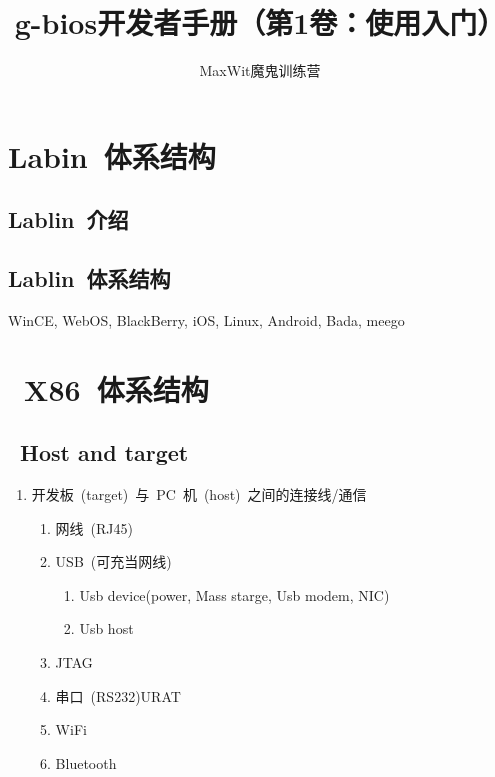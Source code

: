 \documentclass[a4paper,11pt]{article}
\title{g-bios开发者手册（第1卷：使用入门）}
\author{MaxWit魔鬼训练营}
\begin{document}
\begin{CJK*}{UTF8}{gbsn}
\CJKtilde
\maketitle
\tableofcontents

\fi

\clearpage
\section{Labin~体系结构}
\subsection{Lablin~介绍}
\subsection{Lablin~体系结构}

WinCE, WebOS, BlackBerry, iOS, Linux, Android, Bada, meego
\section{~X86~体系结构}
\subsection{~Host and target~}
\begin{enumerate}
\item 开发板~(target)~与~PC~机~(host)~之间的连接线/通信
	\begin{enumerate}
	\item 网线~(RJ45)
	\item USB~(可充当网线)
		\begin{enumerate}\setlength{\itemsep}{-\itemsep}
		\item Usb device(power, Mass starge, Usb modem, NIC)
		\item Usb host
		\end{enumerate}
	\item JTAG
	\item 串口~(RS232)URAT
	\item WiFi
	\item Bluetooth
	\end{enumerate}
\end{enumerate}

\end{CJK*}
\end{document}
